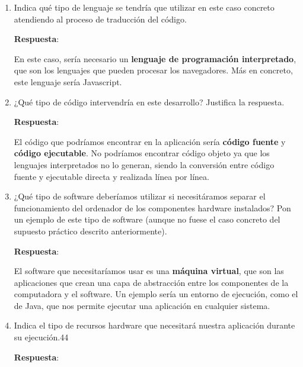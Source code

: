 \begin{enumerate}
    \item Indica qué tipo de lenguaje se tendría que utilizar en este caso concreto atendiendo al proceso de traducción del código.

    \textbf{Respuesta}:

     En este caso, sería necesario un \textbf{lenguaje de programación interpretado}, que son los lenguajes que pueden procesar los navegadores. Más en concreto, este lenguaje sería Javascript.

    \item ¿Qué tipo de código intervendría en este desarrollo? Justifica la respuesta.

    \textbf{Respuesta}:

    El código que podríamos encontrar en la aplicación sería \textbf{código fuente} y \textbf{código ejecutable}. No podríamos encontrar código objeto ya que los lenguajes interpretados no lo generan, siendo la conversión entre código fuente y ejecutable directa y realizada línea por línea.

    \item ¿Qué tipo de software deberíamos utilizar si necesitáramos separar el funcionamiento del ordenador de los componentes hardware instalados? Pon un ejemplo de este tipo de software (aunque no fuese el caso concreto del supuesto práctico descrito anteriormente).

    \textbf{Respuesta}:

    El software que necesitaríamos usar es una \textbf{máquina virtual}, que son las aplicaciones que crean una capa de abstracción entre los componentes de la computadora y el software. Un ejemplo sería un entorno de ejecución, como el de Java, que nos permite ejecutar una aplicación en cualquier sistema.

    \item Indica el tipo de recursos hardware que necesitará nuestra aplicación durante su ejecución.44

    \textbf{Respuesta}:


\end{enumerate}
